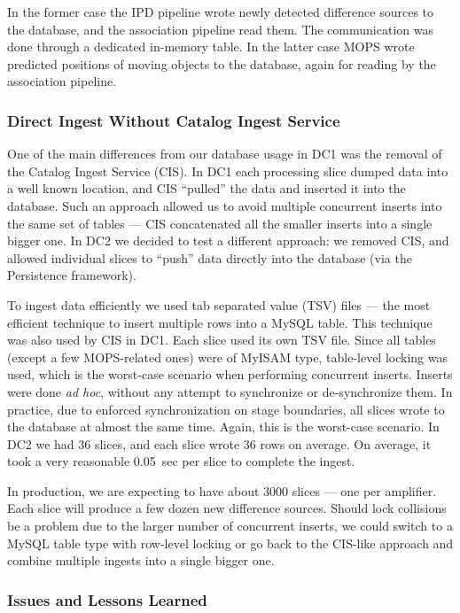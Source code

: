 In the former case the IPD pipeline wrote newly detected 
difference sources to the database, and the association pipeline read them.
The communication was done through a dedicated in-memory table.
In the latter case MOPS wrote predicted
positions of moving objects to the database, again for reading by the
association pipeline.

\subsubsection{Direct Ingest Without Catalog Ingest Service}

One of the main differences from our database usage
in DC1 was the removal of the Catalog Ingest Service (CIS).
In DC1 each processing slice dumped data into a well known
location, and CIS ``pulled'' the data and inserted it
into the database. Such an approach allowed us to avoid multiple concurrent
inserts into the same set of tables --- CIS concatenated all
the smaller inserts into a single bigger one. In DC2 we decided to test a 
different approach: we removed CIS, and allowed individual slices 
to ``push'' data directly into the database (via the Persistence
framework). 

To ingest data efficiently we used tab separated value (TSV) files --- 
the most efficient technique to insert multiple rows into a MySQL 
table. This technique was also used by CIS in DC1. Each slice used 
its own TSV file. Since all tables (except a few MOPS-related ones) 
were of MyISAM type, table-level locking was used, which is 
the worst-case scenario when performing concurrent inserts. 
Inserts were done \textit{ad hoc}, without any attempt to synchronize or 
de-synchronize them. In practice, due to enforced synchronization 
on stage boundaries, all slices wrote to the database at almost the same time. 
Again, this is the worst-case scenario. In DC2 we had 36 slices, 
and each slice wrote 36 rows on average. On average, it took 
a very reasonable 0.05~sec per slice to complete the ingest.

In production, we are expecting to have about 3000 slices --- one per amplifier.
Each slice will produce a few dozen new difference sources.
Should lock collisions be a problem due to the larger number of
concurrent inserts, we could switch to a MySQL table type with row-level 
locking or go back to the CIS-like approach and combine multiple 
ingests into a single bigger one.

\subsubsection{Issues and Lessons Learned}

